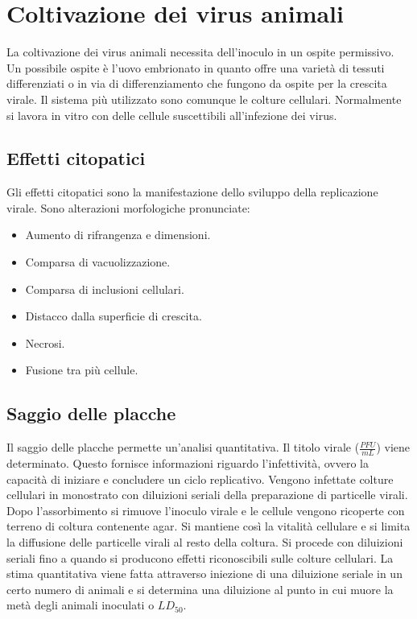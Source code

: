 \section{Coltivazione dei virus animali}
La coltivazione dei virus animali necessita dell'inoculo in un ospite permissivo. 
Un possibile ospite \`e l'uovo embrionato in quanto offre una varietà di tessuti differenziati o in via di differenziamento che fungono da ospite per la crescita virale.
Il sistema pi\`u utilizzato sono comunque le colture cellulari.
Normalmente si lavora in vitro con delle cellule suscettibili all'infezione dei virus. 

	\subsection{Effetti citopatici}
	Gli effetti citopatici sono la manifestazione dello sviluppo della replicazione virale.
	Sono alterazioni morfologiche pronunciate:
	\begin{multicols}{2}
		\begin{itemize}
    			\item Aumento di rifrangenza e dimensioni.
    			\item Comparsa di vacuolizzazione.
    			\item Comparsa di inclusioni cellulari. 
    			\item Distacco dalla superficie di crescita.
    			\item Necrosi.
    			\item Fusione tra più cellule.
		\end{itemize}
	\end{multicols}

	\subsection{Saggio delle placche}
	Il saggio delle placche permette un'analisi quantitativa.
	Il titolo virale ($\frac{PFU}{\si{mL}}$) viene determinato.
	Questo fornisce informazioni riguardo l'infettivit\`a, ovvero la capacit\`a di iniziare e concludere un ciclo replicativo.
	Vengono infettate colture cellulari in monostrato con diluizioni seriali della preparazione di particelle virali.
	Dopo l'assorbimento si rimuove l'inoculo virale e le cellule vengono ricoperte con terreno di coltura contenente agar.
	Si mantiene cos\`i la vitalit\`a cellulare e si limita la diffusione delle particelle virali al resto della coltura.
	Si procede con diluizioni seriali fino a quando si producono effetti riconoscibili sulle colture cellulari.
	La stima quantitativa viene fatta attraverso iniezione di una diluizione seriale in un certo numero di animali e si determina una diluizione al punto in cui muore la met\`a degli animali inoculati o $LD_{50}$.

